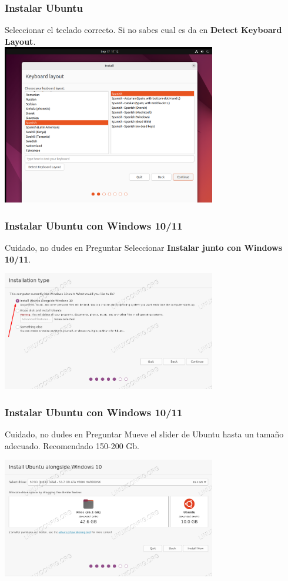 \documentclass[10pt]{beamer}
\begin{document}
	\begin{frame}
		\frametitle{Instalar Ubuntu}
		Seleccionar el teclado correcto. Si no sabes cual es da en \textbf{Detect Keyboard Layout}.\\
		
		
		\includegraphics[width=0.7\textwidth]{keyboard}
	\end{frame}
	
	\begin{frame}
		\frametitle{Instalar Ubuntu con Windows 10/11}
		\begin{alertblock}{Cuidado, no dudes en Preguntar}
			Seleccionar \textbf{Instalar junto con Windows 10/11}.
		\end{alertblock}
		
		\includegraphics[width=0.7\textwidth]{windows-10}
	\end{frame}
	
	\begin{frame}
		\frametitle{Instalar Ubuntu con Windows 10/11}
		\begin{alertblock}{Cuidado, no dudes en Preguntar}
			Mueve el slider de Ubuntu hasta un tamaño adecuado. Recomendado 150-200 Gb.
		\end{alertblock}
		
		\includegraphics[width=0.7\textwidth]{windows-10-2}
	\end{frame}
	
\end{document}
